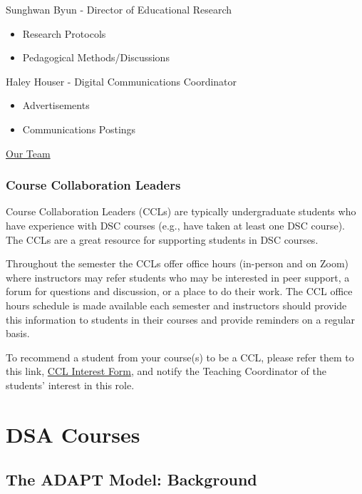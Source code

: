 \documentclass[
]{book}
\providecommand{\tightlist}{%
  \setlength{\itemsep}{0pt}\setlength{\parskip}{0pt}}
\begin{document}
Sunghwan Byun - Director of Educational Research

\begin{itemize}
\tightlist
\item
  Research Protocols
\item
  Pedagogical Methods/Discussions
\end{itemize}

Haley Houser - Digital Communications Coordinator

\begin{itemize}
\tightlist
\item
  Advertisements
\item
  Communications Postings
\end{itemize}

\href{https://datascienceacademy.ncsu.edu/about/our-team/}{Our Team}

\hypertarget{course-collaboration-leaders}{%
\subsection{Course Collaboration Leaders}\label{course-collaboration-leaders}}

Course Collaboration Leaders (CCLs) are typically undergraduate students who have experience with DSC courses (e.g., have taken at least one DSC course). The CCLs are a great resource for supporting students in DSC courses.

Throughout the semester the CCLs offer office hours (in-person and on Zoom) where instructors may refer students who may be interested in peer support, a forum for questions and discussion, or a place to do their work. The CCL office hours schedule is made available each semester and instructors should provide this information to students in their courses and provide reminders on a regular basis.

To recommend a student from your course(s) to be a CCL, please refer them to this link, \href{https://docs.google.com/forms/d/e/1FAIpQLSfl-K8qOfUTh77ahkh_RsTb-dJI8GhbmR0_bUkp7SuJ_tCJTA/viewform}{CCL Interest Form}, and notify the Teaching Coordinator of the students' interest in this role.

\hypertarget{dsa-courses}{%
\chapter{DSA Courses}\label{dsa-courses}}

\hypertarget{the-adapt-model-background}{%
\section{The ADAPT Model: Background}\label{the-adapt-model-background}}
\end{document}
